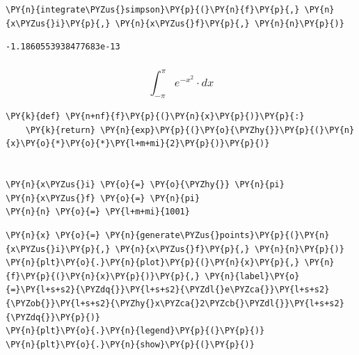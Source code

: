     \begin{tcolorbox}[breakable, size=fbox, boxrule=1pt, pad at break*=1mm,colback=cellbackground, colframe=cellborder]
\begin{Verbatim}[commandchars=\\\{\}]
\PY{n}{integrate\PYZus{}simpson}\PY{p}{(}\PY{n}{f}\PY{p}{,} \PY{n}{x\PYZus{}i}\PY{p}{,} \PY{n}{x\PYZus{}f}\PY{p}{,} \PY{n}{n}\PY{p}{)}
\end{Verbatim}
\end{tcolorbox}

            \begin{tcolorbox}[breakable, size=fbox, boxrule=.5pt, pad at break*=1mm, opacityfill=0]
\begin{Verbatim}[commandchars=\\\{\}]
-1.1860553938477683e-13
\end{Verbatim}
\end{tcolorbox}
        
    \hypertarget{int_-pipi-e-x2-cdot-dx}{%
\subsubsection{\texorpdfstring{\[\int_{-\pi}^{\pi} e^{-x^2} \cdot dx\]}{\textbackslash int\_\{-\textbackslash pi\}\^{}\{\textbackslash pi\} e\^{}\{-x\^{}2\} \textbackslash cdot dx}}\label{int_-pipi-e-x2-cdot-dx}}

    \begin{tcolorbox}[breakable, size=fbox, boxrule=1pt, pad at break*=1mm,colback=cellbackground, colframe=cellborder]
\begin{Verbatim}[commandchars=\\\{\}]
\PY{k}{def} \PY{n+nf}{f}\PY{p}{(}\PY{n}{x}\PY{p}{)}\PY{p}{:}
    \PY{k}{return} \PY{n}{exp}\PY{p}{(}\PY{o}{\PYZhy{}}\PY{p}{(}\PY{n}{x}\PY{o}{*}\PY{o}{*}\PY{l+m+mi}{2}\PY{p}{)}\PY{p}{)}


\PY{n}{x\PYZus{}i} \PY{o}{=} \PY{o}{\PYZhy{}} \PY{n}{pi}
\PY{n}{x\PYZus{}f} \PY{o}{=} \PY{n}{pi}
\PY{n}{n} \PY{o}{=} \PY{l+m+mi}{1001}
\end{Verbatim}
\end{tcolorbox}

    \begin{tcolorbox}[breakable, size=fbox, boxrule=1pt, pad at break*=1mm,colback=cellbackground, colframe=cellborder]
\begin{Verbatim}[commandchars=\\\{\}]
\PY{n}{x} \PY{o}{=} \PY{n}{generate\PYZus{}points}\PY{p}{(}\PY{n}{x\PYZus{}i}\PY{p}{,} \PY{n}{x\PYZus{}f}\PY{p}{,} \PY{n}{n}\PY{p}{)}
\PY{n}{plt}\PY{o}{.}\PY{n}{plot}\PY{p}{(}\PY{n}{x}\PY{p}{,} \PY{n}{f}\PY{p}{(}\PY{n}{x}\PY{p}{)}\PY{p}{,} \PY{n}{label}\PY{o}{=}\PY{l+s+s2}{\PYZdq{}}\PY{l+s+s2}{\PYZdl{}e\PYZca{}}\PY{l+s+s2}{\PYZob{}}\PY{l+s+s2}{\PYZhy{}x\PYZca{}2\PYZcb{}\PYZdl{}}\PY{l+s+s2}{\PYZdq{}}\PY{p}{)}
\PY{n}{plt}\PY{o}{.}\PY{n}{legend}\PY{p}{(}\PY{p}{)}
\PY{n}{plt}\PY{o}{.}\PY{n}{show}\PY{p}{(}\PY{p}{)}
\end{Verbatim}
\end{tcolorbox}

